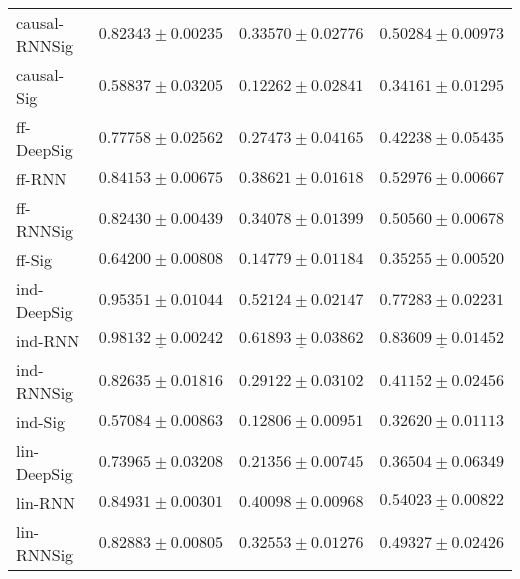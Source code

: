 \begin{tabular}{llll}
causal-RNNSig  &                           $ 0.82343 \pm 0.00235 $ &                           $ 0.33570 \pm 0.02776 $ &                           $ 0.50284 \pm 0.00973 $ \\
causal-Sig     &                           $ 0.58837 \pm 0.03205 $ &                           $ 0.12262 \pm 0.02841 $ &                           $ 0.34161 \pm 0.01295 $ \\
ff-DeepSig     &                           $ 0.77758 \pm 0.02562 $ &                           $ 0.27473 \pm 0.04165 $ &                           $ 0.42238 \pm 0.05435 $ \\
ff-RNN         &                           $ 0.84153 \pm 0.00675 $ &                           $ 0.38621 \pm 0.01618 $ &                           $ 0.52976 \pm 0.00667 $ \\
ff-RNNSig      &                           $ 0.82430 \pm 0.00439 $ &                           $ 0.34078 \pm 0.01399 $ &                           $ 0.50560 \pm 0.00678 $ \\
ff-Sig         &                           $ 0.64200 \pm 0.00808 $ &                           $ 0.14779 \pm 0.01184 $ &                           $ 0.35255 \pm 0.00520 $ \\
ind-DeepSig    &               $  \mathbf{ 0.95351 \pm 0.01044 } $ &               $  \mathbf{ 0.52124 \pm 0.02147 } $ &               $  \mathbf{ 0.77283 \pm 0.02231 } $ \\
ind-RNN        &  $  \mathbf{ \underline{ 0.98132 \pm 0.00242 }} $ &  $  \mathbf{ \underline{ 0.61893 \pm 0.03862 }} $ &  $  \mathbf{ \underline{ 0.83609 \pm 0.01452 }} $ \\
ind-RNNSig     &                           $ 0.82635 \pm 0.01816 $ &                           $ 0.29122 \pm 0.03102 $ &                           $ 0.41152 \pm 0.02456 $ \\
ind-Sig        &                           $ 0.57084 \pm 0.00863 $ &                           $ 0.12806 \pm 0.00951 $ &                           $ 0.32620 \pm 0.01113 $ \\
lin-DeepSig    &                           $ 0.73965 \pm 0.03208 $ &                           $ 0.21356 \pm 0.00745 $ &                           $ 0.36504 \pm 0.06349 $ \\
lin-RNN        &                           $ 0.84931 \pm 0.00301 $ &                           $ 0.40098 \pm 0.00968 $ &            $  \underline{ 0.54023 \pm 0.00822 } $ \\
lin-RNNSig     &                           $ 0.82883 \pm 0.00805 $ &                           $ 0.32553 \pm 0.01276 $ &                           $ 0.49327 \pm 0.02426 $ \\

\end{tabular}
